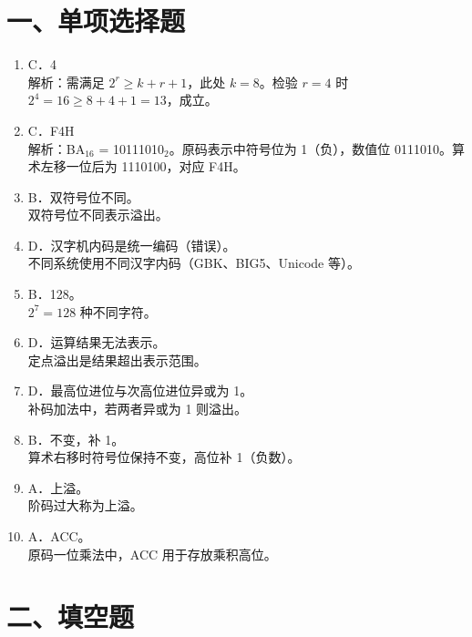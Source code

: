 \documentclass[12pt]{ctexart}
\begin{document}
\section*{一、单项选择题}

\begin{enumerate}
  \item C．4 \\[2pt]
  解析：需满足 $2^r \ge k + r + 1$，此处 $k=8$。检验 $r=4$ 时 $2^4=16 \ge 8+4+1=13$，成立。

  \item C．F4H \\[2pt]
  解析：BA$_{16}$ = 10111010$_2$。原码表示中符号位为 1（负），数值位 0111010。算术左移一位后为 1110100，对应 F4H。

  \item B．双符号位不同。\\
  双符号位不同表示溢出。

  \item D．汉字机内码是统一编码（错误）。\\
  不同系统使用不同汉字内码（GBK、BIG5、Unicode 等）。

  \item B．128。\\
  $2^7 = 128$ 种不同字符。

  \item D．运算结果无法表示。\\
  定点溢出是结果超出表示范围。

  \item D．最高位进位与次高位进位异或为 1。\\
  补码加法中，若两者异或为 1 则溢出。

  \item B．不变，补 1。\\
  算术右移时符号位保持不变，高位补 1（负数）。

  \item A．上溢。\\
  阶码过大称为上溢。

  \item A．ACC。\\
  原码一位乘法中，ACC 用于存放乘积高位。
\end{enumerate}

\section*{二、填空题}
\end{document}
